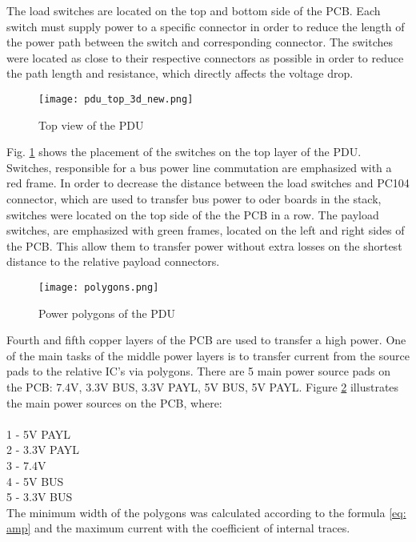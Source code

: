 The load switches are located on the top and bottom side of the PCB. Each switch must supply power to a specific connector in order to reduce the length of the power path between the switch and  corresponding connector. The switches were located as close to their respective connectors as possible in order to reduce the path length and resistance, which directly affects the voltage drop. 

\begin{figure}[h]
	\centering
	\texttt{[image: pdu\_top\_3d\_new.png]}
	\caption{Top view of the PDU}
	\label{fig: toppducon}
\end{figure} 

Fig. \ref{fig: toppducon} shows the placement of the switches on the top layer of the PDU. Switches, responsible for a bus power line commutation are emphasized with a red frame. In order to decrease the distance between the load switches and PC104 connector, which are used to transfer bus power to oder boards in the stack, switches were located on the top side of the the PCB in a row. The payload switches, are emphasized with green frames, located on the left and right sides of the PCB. This allow them to transfer power without extra losses on the shortest distance to the relative payload connectors.



\begin{figure}[h]
	\centering
	\texttt{[image: polygons.png]}
	\caption{Power polygons of the PDU}
	\label{fig: poly}
\end{figure} 

Fourth and fifth copper layers of the PCB are used to transfer a high power. One of the main tasks of the middle power layers is to transfer current from the source pads to the relative IC's via polygons. There are 5 main power source pads on the PCB: 7.4V, 3.3V BUS, 3.3V PAYL, 5V BUS, 5V PAYL. Figure \ref{fig: poly} illustrates the main power sources on the PCB, where:\\ \\
 1 - 5V PAYL\\
 2 - 3.3V PAYL\\
 3 - 7.4V\\
 4 - 5V BUS\\
 5  - 3.3V BUS\\

The minimum width of the polygons was calculated according to the formula \ref{eq: amp} and the maximum current with the coefficient of internal traces.

